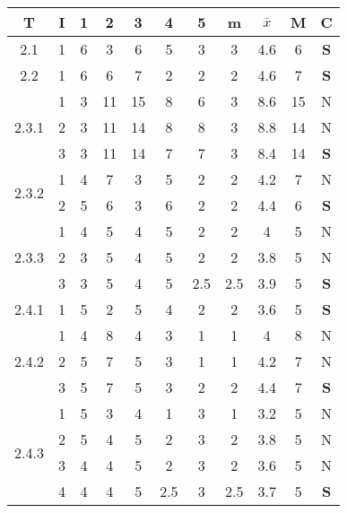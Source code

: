 \documentclass[11pt,a4paper,spanish,twoside]{report}
\begin{document}
\begin{table}[!h]
\centering
  \begin{tabular}{|c|c||c|c|c|c|c||c|c|c||c|}
    \hline
    \textbf{T} & \textbf{I} & \textbf{1} &
    \textbf{2} & \textbf{3} & \textbf{4} & \textbf{5} & \textbf{m}
    &\textbf{$\bar{x}$} &\textbf{M} & \textbf{C}\\
    \hline \hline
    2.1 & 1 & 6 & 3 & 6 & 5 & 3 & 3 & 4.6 & 6 & \textbf{S}\\
    \hline

    2.2 & 1 & 6 & 6 & 7 & 2 & 2 & 2 & 4.6 & 7 & \textbf{S}\\
    \hline

    \multirow{3}{*}{2.3.1}& 1 & 3 & 11 & 15 & 8 & 6 & 3 & 8.6 & 15 & N \\
    & 2 & 3 & 11 & 14 & 8 & 8 & 3 & 8.8 & 14 & N \\
    & 3 & 3 & 11 & 14 & 7 & 7 & 3 & 8.4 & 14 & \textbf{S} \\
    \hline

    \multirow{2}{*}{2.3.2} & 1 & 4 & 7 & 3 & 5 & 2 & 2 & 4.2 & 7 & N \\
    & 2 & 5 & 6 & 3 & 6 & 2 & 2 & 4.4 & 6 & \textbf{S} \\
    \hline

    \multirow{3}{*}{2.3.3}& 1 & 4 & 5 & 4 & 5 & 2 & 2 & 4 & 5 & N \\
    & 2 & 3 & 5 & 4 & 5 & 2 & 2 & 3.8 & 5 & N \\
    & 3 & 3 & 5 & 4 & 5 & 2.5 & 2.5 & 3.9 & 5 & \textbf{S} \\
    \hline

    2.4.1 & 1 & 5 & 2 & 5 & 4 & 2 & 2 & 3.6 & 5 & \textbf{S} \\
    \hline

    \multirow{3}{*}{2.4.2}& 1 & 4 & 8 & 4 & 3 & 1 & 1 & 4 & 8 & N \\
    & 2 & 5 & 7 & 5 & 3 & 1 & 1 & 4.2 & 7 & N \\
    & 3 & 5 & 7 & 5 & 3 & 2 & 2 & 4.4 & 7 & \textbf{S} \\
    \hline

    \multirow{4}{*}{2.4.3}& 1 & 5 & 3 & 4 & 1 & 3 & 1 & 3.2 & 5 & N \\
    & 2 & 5 & 4 & 5 & 2 & 3 & 2 & 3.8 & 5 & N \\
    & 3 & 4 & 4 & 5 & 2 & 3 & 2 & 3.6 & 5 & N \\
    & 4 & 4 & 4 & 5 & 2.5 & 3 & 2.5 & 3.7 & 5 & \textbf{S} \\
    \hline


\end{tabular}
\end{table}
\end{document}
